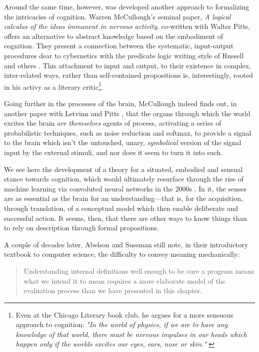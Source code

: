 Around the same time, however, was developed another approach to formalizing the intricacies of cognition. Warren McCullough's seminal paper, \emph{A logical calculus of the ideas immanent in nervous activity}, co-written with Walter Pitts, offers an alternative to abstract knowledge based on the embodiment of cognition. They present a connection between the systematic, input-output procedures dear to cybernetics with the predicate logic writing style of Russell and others \citep{mcculloch_logical_1990}. This attachment to input and output, to their existence in complex, inter-related ways, rather than self-contained propositions is, interestingly, rooted in his activy as a literary critic\footnote{Even at the Chicago Literary book club, he argues for a more sensuous approach to cognition: \emph{"In the world of physics, if we are to have any knowledge of that world, there must be nervous impulses in our heads which happen only if the worlds excites our eyes, ears, nose or skin."} \citep{mcculloch_delusion_1953}}.

Going further in the processes of the brain, McCullough indeed finds out, in another paper with Letvinn and Pitts \citep{lettvin_what_1959}, that the organs through which the world excites the brain \emph{are themselves} agents of process, activating a series of probabilistic techniques, such as noise reduction and softmax, to provide a signal to the brain which isn't the untouched, unary, \emph{symbolical} version of the signal input by the external stimuli, and nor does it seem to turn it into such.

We see here the development of a theory for a situated, embodied and sensual stance towards cognition, which would ultimately resurface through the rise of machine learning via convoluted neural networks in the 2000s \citep{nilsson_quest_2009}. In it, the senses are as essential as the brain for an understanding—that is, for the acquisition, through translation, of a conceptual model which then enable deliberate and successful action. It seems, then, that there are other ways to know things than to rely on description through formal propositions.

A couple of decades later, Abelson and Sussman still note, in their introductory textbook to computer science, the difficulty to convey meaning mechanically:

\begin{quote}
    Understanding internal definitions well enough to be sure a program means what we intend it to mean requires a more elaborate model of the evaluation process than we have presented in this chapter. \citep{abelson_structure_1979}
\end{quote}

